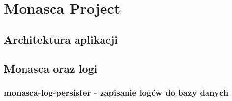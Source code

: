 \chapter[Przykładowa aplikacja]{Monasca Project}
\label{chapter:monasca}

\section{Architektura aplikacji}
\clearpage 
\section{Monasca oraz logi}
\clearpage 
\clearpage 
\clearpage 
\subsection{monasca-log-persister - zapisanie logów do bazy danych}